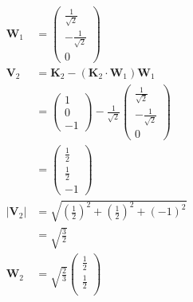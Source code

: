 \documentclass{article}
\begin{document}
\begin{enumerate}
        \begin{align*}
          \mathbf{W}_1   & = \begin{pmatrix}
                               \frac{1}{\sqrt{2}}  \\
                               -\frac{1}{\sqrt{2}} \\
                               0
                             \end{pmatrix}                                           \\
          \mathbf{V}_2   & = \mathbf{K}_2 - (\mathbf{K}_2 \cdot \mathbf{W}_1) \mathbf{W}_1               \\
                         & = \begin{pmatrix}
                               1 \\
                               0 \\
                               -1
                             \end{pmatrix} - \frac{1}{\sqrt{2}} \begin{pmatrix}
                                                                  \frac{1}{\sqrt{2}}  \\
                                                                  -\frac{1}{\sqrt{2}} \\
                                                                  0
                                                                \end{pmatrix}        \\
                         & = \begin{pmatrix}
                               \frac{1}{2} \\
                               \frac{1}{2} \\
                               -1
                             \end{pmatrix}                                                              \\
          |\mathbf{V}_2| & = \sqrt{\left( \frac{1}{2} \right)^2 + \left( \frac{1}{2} \right)^2 + (-1)^2} \\
                         & = \sqrt{\frac{3}{2}}                                                          \\
          \mathbf{W}_2   & = \sqrt{\frac{2}{3}} \begin{pmatrix}
                                                  \frac{1}{2} \\
                                                  \frac{1}{2} \\

\end{pmatrix}
\end{align*}
\end{enumerate}
\end{document}
